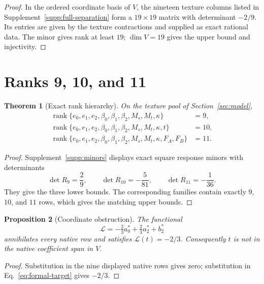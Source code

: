 \documentclass[12pt]{article}
\newtheorem{theorem}{Theorem}[section]
\newtheorem{proposition}[theorem]{Proposition}
\theoremstyle{definition}
\theoremstyle{remark}
\newcommand{\rank}{\operatorname{rank}}
\newcommand{\target}{t}
\begin{document}
\begin{proof}
In the ordered coordinate basis of $V$, the nineteen texture columns listed
in Supplement~\ref{supp:full-separation} form a $19\times19$ matrix with
determinant $-2/9$.  Its entries are given by the texture contractions and
supplied as exact rational data.  The minor gives rank at least $19$;
$\dim V=19$ gives the upper bound and injectivity.
\end{proof}

\section{Ranks 9, 10, and 11}\label{sec:ranks}

\begin{theorem}[Exact rank hierarchy]\label{thm:rank-hierarchy}
On the texture pool of Section~\ref{sec:model},
\begin{align*}
\rank\{e_0,e_1,e_2,\beta_0,\beta_1,\beta_2,M_s,M_t,\kappa\}&=9,\\
\rank\{e_0,e_1,e_2,\beta_0,\beta_1,\beta_2,M_s,M_t,\kappa,\target\}&=10,\\
\rank\{e_0,e_1,e_2,\beta_0,\beta_1,\beta_2,M_s,M_t,\kappa,F_A,F_B\}&=11.
\end{align*}
\end{theorem}

\begin{proof}
Supplement~\ref{supp:minors} displays exact square response minors with
determinants
\[
\det R_9=\frac29,\qquad
\det R_{10}=-\frac5{81},\qquad
\det R_{11}=-\frac1{36}.
\]
They give the three lower bounds.  The corresponding families contain exactly
$9$, $10$, and $11$ rows, which gives the matching upper bounds.
\end{proof}

\begin{proposition}[Coordinate obstruction]\label{prop:obstruction}
The functional
\begin{equation}\label{eq:obstruction}
\mathcal L=-\tfrac23a_0^*+\tfrac23a_2^*+b_2^*
\end{equation}
annihilates every native row and satisfies $\mathcal L(\target)=-2/3$.
Consequently $\target$ is not in the native coefficient span in $V$.
\end{proposition}

\begin{proof}
Substitution in the nine displayed native rows gives zero; substitution in
Eq.~\eqref{eq:formal-target} gives $-2/3$.
\end{proof}
\end{document}
